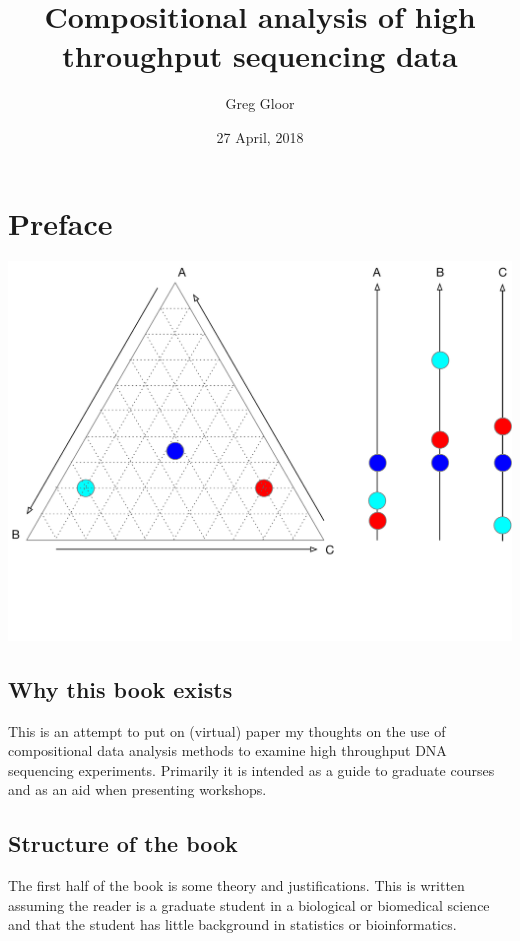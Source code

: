 \documentclass[onecolumn]{book}
\title{Compositional analysis of high throughput sequencing data}
\author{Greg Gloor}
\date{27 April, 2018}
\theoremstyle{definition}
\theoremstyle{definition}
\theoremstyle{definition}
\theoremstyle{remark}
\begin{document}
\maketitle

{
\setcounter{tocdepth}{2}
\tableofcontents
}
\hypertarget{preface}{%
\chapter*{Preface}\label{preface}}

\includegraphics{figs/simplex.pdf}

\hypertarget{why-this-book-exists}{%
\section*{Why this book exists}\label{why-this-book-exists}}

This is an attempt to put on (virtual) paper my thoughts on the use of
compositional data analysis methods to examine high throughput DNA
sequencing experiments. Primarily it is intended as a guide to graduate
courses and as an aid when presenting workshops.

\hypertarget{structure-of-the-book}{%
\section*{Structure of the book}\label{structure-of-the-book}}

The first half of the book is some theory and justifications. This is
written assuming the reader is a graduate student in a biological or
biomedical science and that the student has little background in
statistics or bioinformatics.
\end{document}
